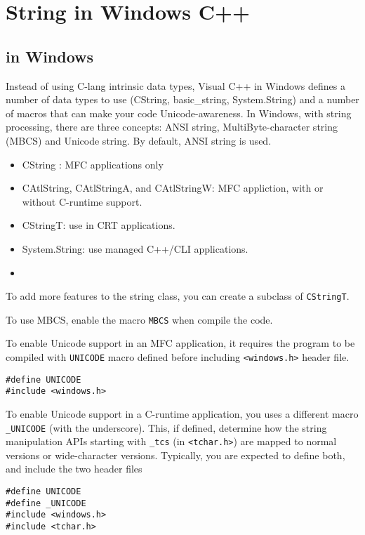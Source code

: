 \section{String in Windows C++}

\subsection{in Windows}
\label{sec:string_Windows}


Instead of using C-lang intrinsic data types, Visual C++ in Windows defines a
number of data types to use (CString, basic\_string, System.String) and a number
of macros that can make your code Unicode-awareness. In Windows, with string
processing, there are three concepts: ANSI string, MultiByte-character string
(MBCS) and Unicode string. By default, ANSI string is used.
\begin{itemize}
  \item CString : MFC applications only
  \item CAtlString, CAtlStringA, and CAtlStringW: MFC appliction, with or
  without C-runtime support.
    
  \item CStringT: use in CRT applications.
  \item System.String: use managed C++/CLI applications.
  \item  
\end{itemize}
To add more features to the string class, you can create a subclass of
\verb!CStringT!. 

To use MBCS, enable the macro \verb!MBCS! when compile the code.

To enable Unicode support in an MFC application, it requires
the program to be compiled with \verb!UNICODE! macro defined before including
\verb!<windows.h>! header file.
\begin{verbatim}
#define UNICODE
#include <windows.h>
\end{verbatim}

To enable Unicode support in a C-runtime application, you uses a different macro
\verb!_UNICODE! (with the underscore). This, if defined, determine how the
string manipulation APIs starting with \verb!_tcs! (in \verb!<tchar.h>!) are
mapped to normal versions or wide-character versions. Typically, you are
expected to define both, and include the two header files
\begin{verbatim}
#define UNICODE
#define _UNICODE
#include <windows.h>
#include <tchar.h>
\end{verbatim}

